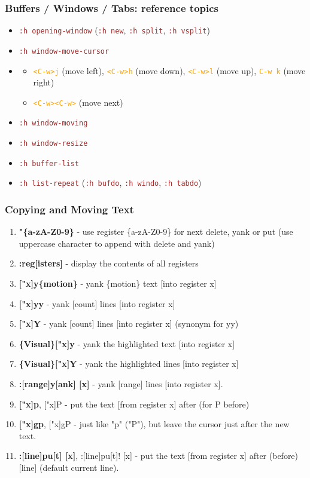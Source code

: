 \documentclass{beamer}
\newcommand{\vimnormal}[1]{\texttt{\textcolor{orange}{#1}}}
\newcommand{\vimcommand}[1]{\texttt{\textcolor{brown}{#1}}}
\newcommand{\vimhelp}[1]{\vimcommand{:h #1}}
\newcommand{\vimkey}[1]{\textless{}#1\textgreater{}}
\begin{document}
\begin{frame}
    \frametitle{Buffers / Windows / Tabs: reference topics}
    \begin{itemize} 
        \item \vimhelp{opening-window} (\vimhelp{new}, \vimhelp{split}, \vimhelp{vsplit}) \\
        \item \vimhelp{window-move-cursor} \\
        \item
        \begin{itemize}
            \item \vimnormal{\vimkey{C-w}j} (move left), \vimnormal{\vimkey{C-w}h} (move down), \vimnormal{\vimkey{C-w}l} (move up), \vimnormal{C-w k} (move right)
            \item \vimnormal{\vimkey{C-w}\vimkey{C-w}} (move next)
        \end{itemize}
        \item \vimhelp{window-moving} 
        \item \vimhelp{window-resize}
        \item \vimhelp{buffer-list} 
        \item \vimhelp{list-repeat} (\vimhelp{bufdo}, \vimhelp{windo}, \vimhelp{tabdo})
    \end{itemize}
\end{frame}

\begin{frame}
    \frametitle{Copying and Moving Text}
    \begin{enumerate}
        \item \textbf{"\{a-zA-Z0-9\}} - use register \{a-zA-Z0-9\} for next delete, yank or put (use uppercase character to append with delete and yank)
        \item \textbf{:reg[isters]} - display the contents of all registers
        \item \textbf{["x]y\{motion\}} - yank \{motion\} text [into register x]
        \item \textbf{["x]yy} - yank [count] lines [into register x]
        \item \textbf{["x]Y} - yank [count] lines [into register x] (synonym for yy)
        \item \textbf{\{Visual\}["x]y} - yank the highlighted text [into register x]
        \item \textbf{\{Visual\}["x]Y} - yank the highlighted lines [into register x]
        \item \textbf{:[range]y[ank] [x]} - yank [range] lines [into register x].
        \item \textbf{["x]p}, ["x]P - put the text [from register x] after (for P before)
        \item \textbf{["x]gp}, ["x]gP - just like "p" ("P"), but leave the cursor just after the new text.
        \item \textbf{:[line]pu[t] [x]}, :[line]pu[t]! [x] - put the text [from register x] after (before) [line] (default current line).
    \end{enumerate}
\end{frame}
\end{document}
